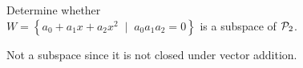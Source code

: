 

\begin{Exercise}[
name={},
title={}, 
difficulty=0,
origin={\cite{YL}}]
Determine whether\\
$W=\left\{a_0+a_1x+a_2x^2\;\mid\; a_0a_1a_2=0\right\}$
is a subspace of  \( \mathcal{P}_2 \).
\end{Exercise}

\begin{Answer}
Not a subspace since it is not closed under vector addition.
\end{Answer}
